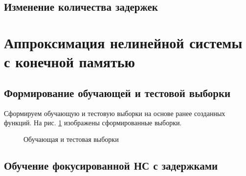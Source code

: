 
\subsection{Изменение количества задержек}


\newpage

\section{Аппроксимация нелинейной системы с конечной памятью}

\subsection{Формирование обучающей и тестовой выборки}


Сформируем обучающую и тестовую выборки на основе ранее созданных функций. На рис. \ref{fig:3_1} изображены сформированные выборки.
\begin{figure}[H]
\begin{center}
	\caption{Обучающая и тестовая выборки}
	\label{fig:3_1}
\end{center}
\end{figure}

\subsection{Обучение фокусированной НС с задержками}

